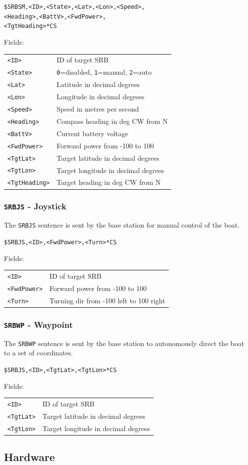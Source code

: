 \documentclass[a4paper]{IEEEtran}
\newenvironment{nmeaspec}[1]
{
\newcommand{\field}[2]{\texttt{##1} & ##2 \\}
\vspace{0.2cm}
\noindent\texttt{#1}
\vspace{0.2cm}

\noindent Fields:
\vspace{0.1cm} \\ 
\noindent \vspace{0.2cm}
\begin{tabular}{ll}
}
{
\end{tabular}
}
\begin{document}
\begin{nmeaspec}{\$SRBSM,<ID>,<State>,<Lat>,<Lon>,<Speed>,\\<Heading>,<BattV>,<FwdPower>,\\<TgtHeading>*CS}
\field{<ID>}{ID of target SRB}
\field{<State>}{\texttt{0}=disabled, \texttt{1}=manual, \texttt{2}=auto}
\field{<Lat>}{Latitude in decimal degrees}
\field{<Lon>}{Longitude in decimal degrees}
\field{<Speed>}{Speed in metres per second}
\field{<Heading>}{Compass heading in deg CW from N}
\field{<BattV>}{Current battery voltage}
\field{<FwdPower>}{Forward power from -100 to 100}
\field{<TgtLat>}{Target latitude in decimal degrees}
\field{<TgtLon>}{Target longitude in decimal degrees}
\field{<TgtHeading>}{Target heading in deg CW from N}
\end{nmeaspec}

\subsubsection{\texttt{SRBJS} - Joystick}
The \texttt{SRBJS} sentence is sent by the base station for manual control of the boat.

\begin{nmeaspec}{\$SRBJS,<ID>,<FwdPower>,<Turn>*CS}
\field{<ID>}{ID of target SRB}
\field{<FwdPower>}{Forward power from -100 to 100}
\field{<Turn>}{Turning dir from -100 left to 100 right}
\end{nmeaspec}

\subsubsection{\texttt{SRBWP} - Waypoint}
The \texttt{SRBWP} sentence is sent by the base station to autonomously direct the boat to a set of coordinates.

\begin{nmeaspec}{\$SRBJS,<ID>,<TgtLat>,<TgtLon>*CS}
\field{<ID>}{ID of target SRB}
\field{<TgtLat>}{Target latitude in decimal degrees}
\field{<TgtLon>}{Target longitude in decimal degrees}
\end{nmeaspec}

\subsection{Hardware}
\end{document}
